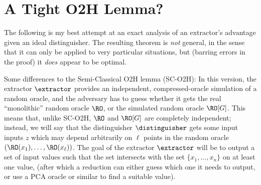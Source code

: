 \section{A Tight O2H Lemma?}
  The following is my best attempt at an exact analysis of an extractor's
    advantage given an ideal distinguisher. The resulting theorem is \emph{not}
    general, in the sense that it can only be applied to very particular
    situations, but (barring errors in the proof) it \emph{does} appear to be optimal.

  Some differences to the Semi-Classical O2H lemma (SC-O2H): In this version, the 
    extractor $\extractor$ provides an independent, compressed-oracle
    simulation of a random oracle, and the adversary has to guess whether it
    gets the real ``monolithic'' random oracle $\RO$, or the simulated random
    oracle $\RO[G]$. This means that, unlike SC-O2H, $\RO$ and $\RO[G]$ are
    completely independent; instead, we will say that
    the distinguisher $\distinguisher$ gets some input
    inputs $z$ which may depend arbitrarily on $\ell$ points in the random
    oracle $(\RO(x_1), \ldots, \RO(x_\ell))$. The
    goal of the extractor $\extractor$ will be to output a set of input values
    such that the set intersects with the set $\{x_1, \ldots, x_n\}$ on at
    least one value, (after which a reduction can either guess which one it
    needs to output, or use a PCA oracle or similar to find a suitable value). 
